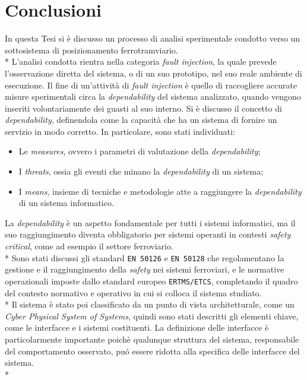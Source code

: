 \chapter{Conclusioni}
In questa Tesi si \`e discusso un processo di analisi sperimentale condotto verso un sottosistema di posizionamento ferrotramviario.\\*
L'analisi condotta rientra nella categoria \emph{fault injection}, la quale prevede l'osservazione diretta del sistema, o di un suo prototipo, nel suo reale ambiente di esecuzione. Il fine di un'attivit\`a di \emph{fault injection} \`e quello di raccogliere accurate misure sperimentali circa la \emph{dependability} del sistema analizzato, quando vengono inseriti volontariamente dei guasti al suo interno. Si \`e discusso il concetto di \emph{dependability}, definendola come la capacit\`a che ha un sistema di fornire un servizio in modo corretto. In particolare, sono stati individuati:
\begin{itemize}
	\item Le \emph{measures}, ovvero i parametri di valutazione della \emph{dependability};
	\item I \emph{threats}, ossia gli eventi che minano la \emph{dependability} di un sistema;
	\item I \emph{means}, insieme di tecniche e metodologie atte a raggiungere la \emph{dependability} di un sistema informatico.
\end{itemize}
La \emph{dependability} \`e un aspetto fondamentale per tutti i sistemi informatici, ma il suo raggiungimento diventa obbligatorio per sistemi operanti in contesti \emph{safety critical}, come ad esempio il settore ferroviario.\\*
Sono stati discussi gli standard \texttt{EN 50126} e \texttt{EN 50128} che regolamentano la gestione e il raggiungimento della \emph{safety} nei sistemi ferroviari, e le normative operazionali imposte dallo standard europeo \texttt{ERTMS/ETCS}, completando il quadro del contesto normativo e operativo in cui si colloca il sistema studiato.\\*
Il sistema \`e stato poi classificato da un punto di vista architetturale, come un \emph{Cyber Physical System of Systems}, quindi sono stati descritti gli elementi chiave, come le interfacce e i sistemi costituenti. La definizione delle interfacce \`e particolarmente importante poich\`e qualunque struttura del sistema, responsabile del comportamento osservato, pu\'o essere ridotta alla specifica delle interfacce del sistema.\\*
